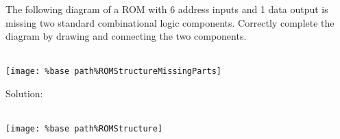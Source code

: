 The following diagram of a ROM with 6 address inputs and 1 data output is missing two standard combinational logic components.  Correctly complete the diagram by drawing and connecting the two components.\\ \\
\begin{center}
  \texttt{[image: \%base path\%ROMStructureMissingParts]}
\end{center}

Solution: \\ \\
\begin{center}
  \texttt{[image: \%base path\%ROMStructure]}
\end{center}
